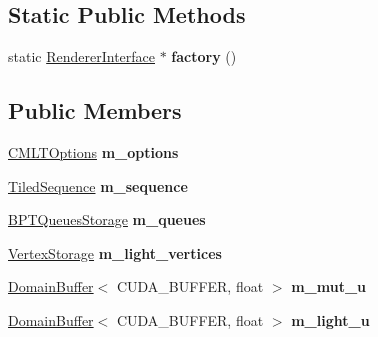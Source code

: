 \subsection*{Static Public Methods}
\begin{DoxyCompactItemize}
\item 
\mbox{\label{struct_c_m_l_t_a548944cf739086aed1bb4feb56a1a081}} 
static \hyperlink{struct_renderer_interface}{Renderer\+Interface} $\ast$ {\bfseries factory} ()
\end{DoxyCompactItemize}
\subsection*{Public Members}
\begin{DoxyCompactItemize}
\item 
\mbox{\label{struct_c_m_l_t_afb7185888d73dbe2574eeb9c0b8658cb}} 
\hyperlink{struct_c_m_l_t_options}{C\+M\+L\+T\+Options} {\bfseries m\+\_\+options}
\item 
\mbox{\label{struct_c_m_l_t_a1ec0cab631a0456d591ebfc64ffca5ac}} 
\hyperlink{struct_tiled_sequence}{Tiled\+Sequence} {\bfseries m\+\_\+sequence}
\item 
\mbox{\label{struct_c_m_l_t_a129fe15289ff32fc5852d50f56fecd5e}} 
\hyperlink{struct_b_p_t_queues_storage}{B\+P\+T\+Queues\+Storage} {\bfseries m\+\_\+queues}
\item 
\mbox{\label{struct_c_m_l_t_a7cf3b75b71572947e51414041d311b4f}} 
\hyperlink{struct_vertex_storage}{Vertex\+Storage} {\bfseries m\+\_\+light\+\_\+vertices}
\item 
\mbox{\label{struct_c_m_l_t_a8ef86b04a206fd3d4f78ef95e17b9f5d}} 
\hyperlink{class_domain_buffer}{Domain\+Buffer}$<$ C\+U\+D\+A\+\_\+\+B\+U\+F\+F\+ER, float $>$ {\bfseries m\+\_\+mut\+\_\+u}
\item 
\mbox{\label{struct_c_m_l_t_a2192a8b3ddaad34406c08fba43d3bd7c}} 
\hyperlink{class_domain_buffer}{Domain\+Buffer}$<$ C\+U\+D\+A\+\_\+\+B\+U\+F\+F\+ER, float $>$ {\bfseries m\+\_\+light\+\_\+u}
\item 
\mbox{\label{struct_c_m_l_t_aa4dcea45cec16bccbaa404681e5ea484}} 

\end{DoxyCompactItemize}
